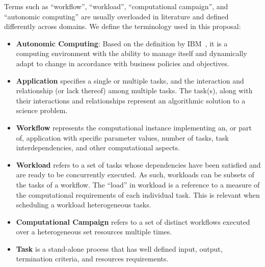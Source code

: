 Terms such as ``workflow'', ``workload'', ``computational campaign'', and 
``autonomic computing'' are usually overloaded in literature and defined 
differently across domains. We define the terminology used in this proposal:
\begin{itemize}
    \item \textbf{Autonomic Computing}: Based on the definition by 
    IBM~\cite{ibm2005autonomic}, it is a computing environment with the ability 
    to manage itself and dynamically adapt to change in accordance with 
    business policies and objectives.
    \item \textbf{Application} specifies a single or multiple tasks, and the 
    interaction and relationship (or lack thereof) among multiple tasks. The 
    task(s), along with their interactions and relationships represent an 
    algorithmic solution to a science problem.
    \item \textbf{Workflow} represents the computational instance implementing 
    an, or part of, application with specific parameter values, number of tasks, 
    task interdependencies, and other computational aspects.
    \item \textbf{Workload} refers to a set of tasks whose dependencies have 
    been satisfied and are ready to be concurrently executed. As such, 
    workloads can be subsets of the tasks of a workflow. The “load” in workload 
    is a reference to a measure of the computational requirements of each 
    individual task. This is relevant when scheduling a workload heterogeneous 
    tasks.
    \item \textbf{Computational Campaign} refers to a set of distinct workflows 
    executed over a heterogeneous set resources multiple times.
    \item \textbf{Task} is a stand-alone process that has well defined input, 
    output, termination criteria, and resources requirements.
\end{itemize}